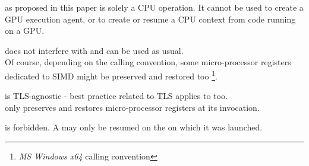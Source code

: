 \newpage
{}


\cc as proposed in this paper is solely a CPU operation. It cannot be used to
create a GPU execution agent, or to create or resume a CPU context from code
running on a GPU.



does not interfere with \cc and can be used as usual.\\

Of course, depending on the calling convention, some micro-processor registers
dedicated to SIMD might be preserved and restored too
\footnote{\emph{MS Windows x64} calling convention}.



\cc is TLS-agnostic - best practice related to TLS applies to \cc too.\\

\cc only preserves and restores micro-processor registers at its invocation.



is forbidden. A \cont may only be resumed on the  on which it
was launched.
